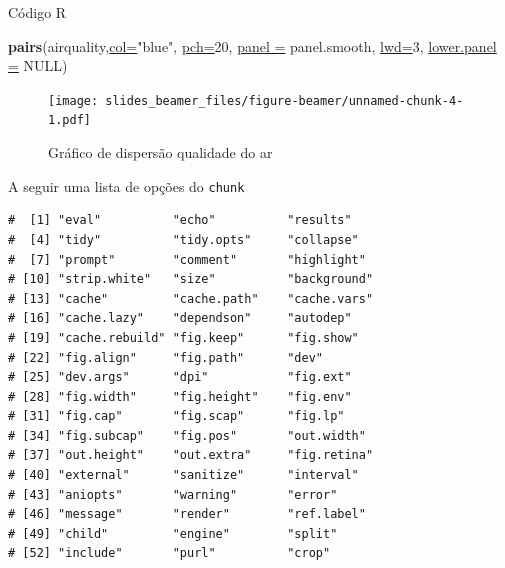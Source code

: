 \documentclass[10pt,ignorenonframetext,]{beamer}
\newenvironment{Shaded}{\begin{snugshade}}{\end{snugshade}}
\newcommand{\DataTypeTok}[1]{\textcolor[rgb]{0.74,0.68,0.62}{\underline{#1}}}
\newcommand{\DecValTok}[1]{\textcolor[rgb]{0.27,0.67,0.26}{#1}}
\newcommand{\KeywordTok}[1]{\textcolor[rgb]{0.26,0.66,0.93}{\textbf{#1}}}
\newcommand{\NormalTok}[1]{\textcolor[rgb]{0.74,0.68,0.62}{#1}}
\newcommand{\OperatorTok}[1]{\textcolor[rgb]{0.74,0.68,0.62}{#1}}
\newcommand{\OtherTok}[1]{\textcolor[rgb]{0.74,0.68,0.62}{#1}}
\newcommand{\StringTok}[1]{\textcolor[rgb]{0.02,0.61,0.04}{#1}}
\begin{document}
\begin{frame}[fragile]{Código R}
\protect\hypertarget{cuxf3digo-r-1}{}

\begin{Shaded}
\begin{Highlighting}[]
\KeywordTok{pairs}\NormalTok{(airquality,}\DataTypeTok{col=}\StringTok{"blue"}\NormalTok{, }\DataTypeTok{pch=}\DecValTok{20}\NormalTok{,}
      \DataTypeTok{panel =}\NormalTok{ panel.smooth, }\DataTypeTok{lwd=}\DecValTok{3}\NormalTok{, }\DataTypeTok{lower.panel =} \OtherTok{NULL}\NormalTok{)}
\end{Highlighting}
\end{Shaded}

\begin{figure}
\centering
\texttt{[image: slides\_beamer\_files/figure-beamer/unnamed-chunk-4-1.pdf]}
\caption{Gráfico de dispersão qualidade do ar}
\end{figure}

\end{frame}

\begin{frame}[fragile]{A seguir uma lista de opções do \texttt{chunk}}
\protect\hypertarget{a-seguir-uma-lista-de-opuxe7uxf5es-do-chunk}{}

\begin{Shaded}
\end{Shaded}

\begin{verbatim}
#  [1] "eval"          "echo"          "results"      
#  [4] "tidy"          "tidy.opts"     "collapse"     
#  [7] "prompt"        "comment"       "highlight"    
# [10] "strip.white"   "size"          "background"   
# [13] "cache"         "cache.path"    "cache.vars"   
# [16] "cache.lazy"    "dependson"     "autodep"      
# [19] "cache.rebuild" "fig.keep"      "fig.show"     
# [22] "fig.align"     "fig.path"      "dev"          
# [25] "dev.args"      "dpi"           "fig.ext"      
# [28] "fig.width"     "fig.height"    "fig.env"      
# [31] "fig.cap"       "fig.scap"      "fig.lp"       
# [34] "fig.subcap"    "fig.pos"       "out.width"    
# [37] "out.height"    "out.extra"     "fig.retina"   
# [40] "external"      "sanitize"      "interval"     
# [43] "aniopts"       "warning"       "error"        
# [46] "message"       "render"        "ref.label"    
# [49] "child"         "engine"        "split"        
# [52] "include"       "purl"          "crop"
\end{verbatim}

\end{frame}
\end{document}
